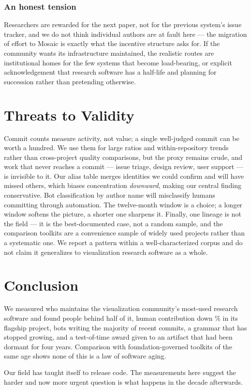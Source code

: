 \documentclass[9pt,twocolumn,letterpaper]{article}
\begin{document}
\subsubsection{An honest tension}
Researchers are rewarded for the next paper, not for the previous system's
issue tracker, and we do not think individual authors are at fault here --- the
migration of effort to Mosaic is exactly what the incentive structure asks for.
If the community wants its infrastructure maintained, the realistic routes are
institutional homes for the few systems that become load-bearing, or explicit
acknowledgement that research software has a half-life and planning for
succession rather than pretending otherwise.

\section{Threats to Validity}
\label{sec:threats}

Commit counts measure activity, not value; a single well-judged commit can be
worth a hundred. We use them for large ratios and within-repository trends
rather than cross-project quality comparisons, but the proxy remains crude, and
work that never reaches a commit --- issue triage, design review, user support
--- is invisible to it. Our alias table merges identities we could confirm and
will have missed others, which biases concentration \emph{downward}, making our
central finding conservative. Bot classification by author name will
misclassify humans committing through automation. The twelve-month window is a
choice; a longer window softens the picture, a shorter one sharpens it.
Finally, one lineage is not the field --- it is the best-documented case, not a
random sample, and the comparison toolkits are a convenience sample of widely
used projects rather than a systematic one. We report a pattern within a
well-characterized corpus and do not claim it generalizes to visualization
research software as a whole.

\section{Conclusion}

We measured who maintains the visualization community's most-used research
software and found \ecobusfifty{} people behind half of it, human contribution
down \vldecline\% in its flagship project, bots writing the majority of recent
commits, a grammar that has stopped growing, and a test-of-time award given to
an artifact that had been dormant for four years. Comparison with
foundation-governed toolkits of the same age shows none of this is a law of
software aging.

Our field has taught itself to release code. The measurements here suggest the
harder and now more urgent question is what happens in the decade afterwards.

{\small


}
\end{document}
